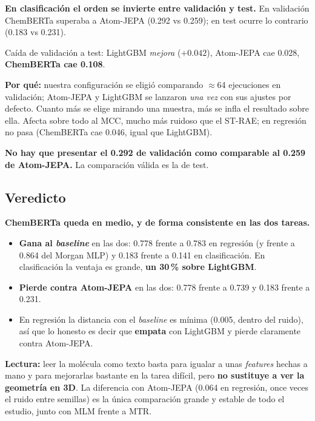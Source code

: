 \documentclass[11pt,a4paper]{article}
\begin{document}
\begin{concl}
\textbf{En clasificación el orden se invierte entre validación y test.} En validación ChemBERTa
superaba a Atom-JEPA (0.292 vs 0.259); en test ocurre lo contrario (0.183 vs 0.231).

\smallskip
Caída de validación a test: LightGBM \emph{mejora} ($+0.042$), Atom-JEPA cae 0.028,
\textbf{ChemBERTa cae 0.108}.

\smallskip
\textbf{Por qué:} nuestra configuración se eligió comparando $\approx$64 ejecuciones en validación;
Atom-JEPA y LightGBM se lanzaron \emph{una vez} con sus ajustes por defecto. Cuanto más se elige
mirando una muestra, más se infla el resultado sobre ella. Afecta sobre todo al MCC, mucho más
ruidoso que el ST-RAE; en regresión no pasa (ChemBERTa cae 0.046, igual que LightGBM).

\smallskip
\textbf{No hay que presentar el 0.292 de validación como comparable al 0.259 de Atom-JEPA.}
La comparación válida es la de test.
\end{concl}

\subsection*{Veredicto}

\begin{concl}
\textbf{ChemBERTa queda en medio, y de forma consistente en las dos tareas.}
\begin{itemize}
  \item \textbf{Gana al \emph{baseline}} en las dos: 0.778 frente a 0.783 en regresión (y frente a
        0.864 del Morgan MLP) y 0.183 frente a 0.141 en clasificación. En clasificación la ventaja es
        grande, \textbf{un 30\,\% sobre LightGBM}.
  \item \textbf{Pierde contra Atom-JEPA} en las dos: 0.778 frente a 0.739 y 0.183 frente a 0.231.
  \item En regresión la distancia con el \emph{baseline} es mínima (0.005, dentro del ruido), así que
        lo honesto es decir que \textbf{empata} con LightGBM y pierde claramente contra Atom-JEPA.
\end{itemize}

\smallskip
\textbf{Lectura:} leer la molécula como texto basta para igualar a unas \emph{features} hechas a mano y
para mejorarlas bastante en la tarea difícil, pero \textbf{no sustituye a ver la geometría en 3D}. La
diferencia con Atom-JEPA (0.064 en regresión, once veces el ruido entre semillas) es la única
comparación grande y estable de todo el estudio, junto con MLM frente a MTR.
\end{concl}
\end{document}

